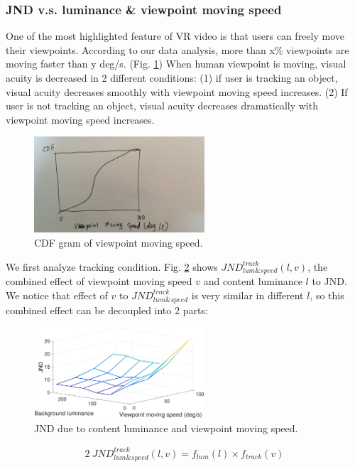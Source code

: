 \subsubsection{JND v.s. luminance \& viewpoint moving speed}

One of the most highlighted feature of VR video is that users can freely move their viewpoints. According to our data analysis, more than x\% viewpoints are moving faster than y deg/s. (Fig. \ref{CDFspeed}) When human viewpoint is moving, visual acuity is decreased in 2 different conditions: (1) if user is tracking an object, visual acuity decreases smoothly with viewpoint moving speed increases. (2) If user is not tracking an object, visual acuity decreases dramatically with viewpoint moving speed increases. \cite{speed}

\begin{figure}
  \centering
  \includegraphics[width=2.5in]{images/movingspeedCDF.jpeg}
  \caption{CDF gram of viewpoint moving speed.}
  \label{CDFspeed}
  \end{figure}
  
We first analyze tracking condition. Fig. \ref{JNDspeed-lum-track} shows $JND_{lum\&speed}^{track}(l, v)$, the combined effect of viewpoint moving speed $v$ and content luminance $l$ to JND. We notice that effect of $v$ to $JND_{lum\&speed}^{track}$ is very similar in different $l$, so this combined effect can be decoupled into 2 parts:

\begin{figure}
  \centering
  \includegraphics[width=2.5in]{images/JNDspeed-lum.eps}
  \caption{JND due to content luminance and viewpoint moving speed.}
  \label{JNDspeed-lum-track}
  \end{figure}

\begin{alignat}{2}\
JND_{lum\&speed}^{track}(l, v) = f_{lum}(l) \times f_{track}(v)
\end{alignat}

